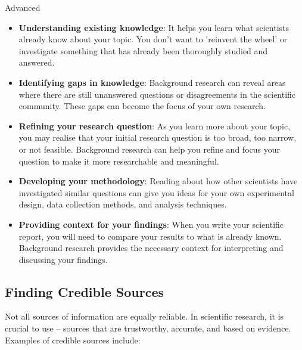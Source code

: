 \begin{tieredquestions}{Advanced}
\begin{itemize}
    \item \textbf{Understanding existing knowledge}: It helps you learn what scientists already know about your topic. You don't want to 'reinvent the wheel' or investigate something that has already been thoroughly studied and answered.
    \item \textbf{Identifying gaps in knowledge}: Background research can reveal areas where there are still unanswered questions or disagreements in the scientific community. These gaps can become the focus of your own research.
    \item \textbf{Refining your research question}:  As you learn more about your topic, you may realise that your initial research question is too broad, too narrow, or not feasible. Background research can help you refine and focus your question to make it more researchable and meaningful.
    \item \textbf{Developing your methodology}: Reading about how other scientists have investigated similar questions can give you ideas for your own experimental design, data collection methods, and analysis techniques.
    \item \textbf{Providing context for your findings}:  When you write your scientific report, you will need to compare your results to what is already known. Background research provides the necessary context for interpreting and discussing your findings.
\end{itemize}

\subsection{Finding Credible Sources}

Not all sources of information are equally reliable.  In scientific research, it is crucial to use  – sources that are trustworthy, accurate, and based on evidence.  Examples of credible sources include:


\end{tieredquestions}
